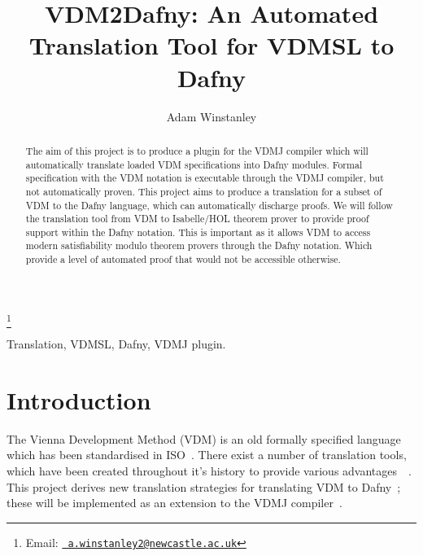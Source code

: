 \documentclass{entcs}
\newcommand{\lfcomment}[1]{\ifthenelse { \boolean{showComments} } {\textcolor{red}{LF:~#1}} { } } %
\begin{document}
\begin{frontmatter}
\title{VDM2Dafny: An Automated Translation Tool for VDMSL to Dafny}
\author{Adam Winstanley}
  \address{School of Computing Science, Newcastle University, UK} 
\thanks[adamemail]{Email:
    \href{mailto:a.winstanley2@newcastle.ac.uk} {\texttt{\normalshape
        a.winstanley2@newcastle.ac.uk}}}

			
				
\begin{abstract} 
The aim of this project is to produce a plugin for the VDMJ compiler which will automatically translate loaded VDM specifications into Dafny modules. Formal specification with the VDM notation is executable through the VDMJ compiler, but not automatically proven. This project aims to produce a translation for a subset of VDM to the Dafny language, which can automatically discharge proofs. We will follow the translation tool from VDM to Isabelle/HOL theorem prover to provide proof support within the Dafny notation. This is important as it allows VDM to access modern satisfiability modulo theorem provers through the Dafny notation. Which provide a level of automated proof that would not be accessible otherwise.

\end{abstract}

\begin{keyword}
Translation, VDMSL, Dafny, VDMJ plugin.
\end{keyword}
\end{frontmatter}

\section{Introduction}\label{section:introduction}

The Vienna Development Method (VDM) is an old formally specified language which has been standardised in ISO~\cite{ISOVDMSL}. There exist a number of translation tools, which have been created throughout it's history to provide various advantages~\cite{VDM2ISA}~\cite{VDM2UML}. This project derives new translation strategies for translating VDM to Dafny~\cite{DfyRef}; these will be implemented as an extension to the VDMJ compiler~\cite{VDMJ}. 
\end{document}
